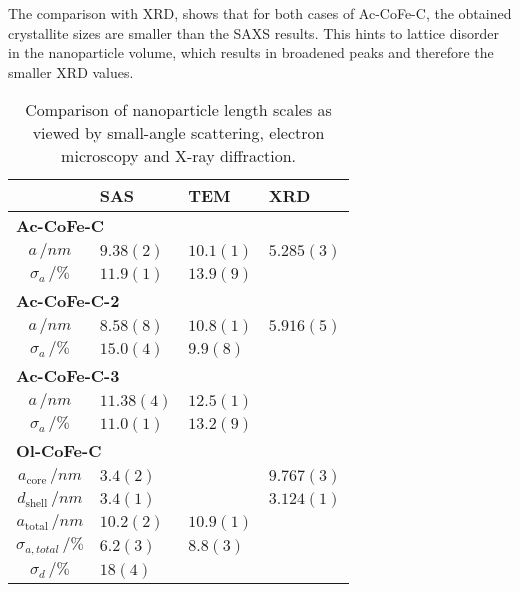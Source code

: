 \documentclass[\main/dresen_thesis.tex]{subfiles}
\begin{document}
    The comparison with XRD, shows that for both cases of Ac-CoFe-C, the obtained crystallite sizes are smaller than the SAXS results.
    This hints to lattice disorder in the nanoparticle volume, which results in broadened peaks and therefore the smaller XRD values.
    \begin{table}[!htbp]
      \centering
      \caption{\label{tab:monolayers:nanoparticle:saxs:sizeComparison}Comparison of nanoparticle length scales as viewed by small-angle scattering, electron microscopy and X-ray diffraction.}
      \begin{tabular}{ c | l | l | l }
                            & \textbf{SAS} & \textbf{TEM} & \textbf{XRD}\\
        \hline
        \multicolumn{4}{l}{\textbf{Ac-CoFe-C}}\\
        \hline
        $a \, / \unit{nm}$  & $9.38(2)$       & $10.1(1)$ & $5.285(3)$\\
        $\sigma_a \, / \%$  & $11.9(1)$       & $13.9(9)$ & \\
        \hline
        \multicolumn{4}{l}{\textbf{Ac-CoFe-C-2}}\\
        \hline
        $a \, / \unit{nm}$  & $8.58(8)$       & $10.8(1)$ & $5.916(5)$\\
        $\sigma_a \, / \%$  & $15.0(4)$       & $9.9(8)$  & \\
        \hline
        \multicolumn{4}{l}{\textbf{Ac-CoFe-C-3}}\\
        \hline
        $a \, / \unit{nm}$  & $11.38(4)$       & $12.5(1)$ & \\
        $\sigma_a \, / \%$  & $11.0(1)$        & $13.2(9)$ & \\
        \hline
        \multicolumn{4}{l}{\textbf{Ol-CoFe-C}}\\
        \hline
        $a_\mathrm{core} \, / \unit{nm}$      & $3.4(2)$        &           & $9.767(3)$\\
        $d_\mathrm{shell} \, / \unit{nm}$     & $3.4(1)$        &           & $3.124(1)$\\
        $a_\mathrm{total} \, / \unit{nm}$     & $10.2(2)$       & $10.9(1)$ & \\
        $\sigma_{a, total} \, / \%$           & $6.2(3)$        & $8.8(3)$  & \\
        $\sigma_{d} \, / \%$                  & $18(4)$         &           & \\
        \hline
      \end{tabular}
    \end{table}
\end{document}
